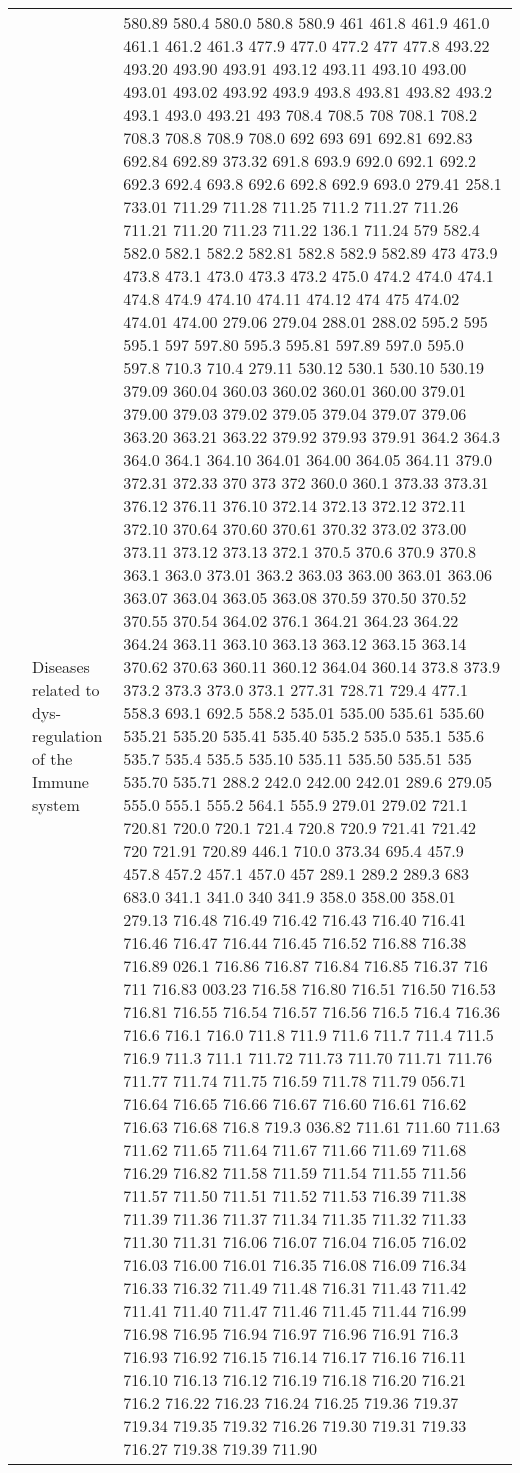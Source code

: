 \begin{longtable}{|R{.05in}|L{.5in}||L{5.75in}|}
   & Diseases related to dys-regulation of the Immune system &   580.89 580.4 580.0 580.8 580.9 461 461.8 461.9 461.0 461.1 461.2 461.3 477.9 477.0 477.2 477 477.8 493.22 493.20 493.90 493.91 493.12 493.11 493.10 493.00 493.01 493.02 493.92 493.9 493.8 493.81 493.82 493.2 493.1 493.0 493.21 493 708.4 708.5 708 708.1 708.2 708.3 708.8 708.9 708.0 692 693 691 692.81 692.83 692.84 692.89 373.32 691.8 693.9 692.0 692.1 692.2 692.3 692.4 693.8 692.6 692.8 692.9 693.0 279.41 258.1 733.01 711.29 711.28 711.25 711.2 711.27 711.26 711.21 711.20 711.23 711.22 136.1 711.24 579 582.4 582.0 582.1 582.2 582.81 582.8 582.9 582.89 473 473.9 473.8 473.1 473.0 473.3 473.2 475.0 474.2 474.0 474.1 474.8 474.9 474.10 474.11 474.12 474 475 474.02 474.01 474.00 279.06 279.04 288.01 288.02 595.2 595 595.1 597 597.80 595.3 595.81 597.89 597.0 595.0 597.8 710.3 710.4 279.11 530.12 530.1 530.10 530.19 379.09 360.04 360.03 360.02 360.01 360.00 379.01 379.00 379.03 379.02 379.05 379.04 379.07 379.06 363.20 363.21 363.22 379.92 379.93 379.91 364.2 364.3 364.0 364.1 364.10 364.01 364.00 364.05 364.11 379.0 372.31 372.33 370 373 372 360.0 360.1 373.33 373.31 376.12 376.11 376.10 372.14 372.13 372.12 372.11 372.10 370.64 370.60 370.61 370.32 373.02 373.00 373.11 373.12 373.13 372.1 370.5 370.6 370.9 370.8 363.1 363.0 373.01 363.2 363.03 363.00 363.01 363.06 363.07 363.04 363.05 363.08 370.59 370.50 370.52 370.55 370.54 364.02 376.1 364.21 364.23 364.22 364.24 363.11 363.10 363.13 363.12 363.15 363.14 370.62 370.63 360.11 360.12 364.04 360.14 373.8 373.9 373.2 373.3 373.0 373.1 277.31 728.71 729.4 477.1 558.3 693.1 692.5 558.2 535.01 535.00 535.61 535.60 535.21 535.20 535.41 535.40 535.2 535.0 535.1 535.6 535.7 535.4 535.5 535.10 535.11 535.50 535.51 535 535.70 535.71 288.2 242.0 242.00 242.01 289.6 279.05 555.0 555.1 555.2 564.1 555.9 279.01 279.02 721.1 720.81 720.0 720.1 721.4 720.8 720.9 721.41 721.42 720 721.91 720.89 446.1 710.0 373.34 695.4 457.9 457.8 457.2 457.1 457.0 457 289.1 289.2 289.3 683 683.0 341.1 341.0 340 341.9 358.0 358.00 358.01 279.13 716.48 716.49 716.42 716.43 716.40 716.41 716.46 716.47 716.44 716.45 716.52 716.88 716.38 716.89 026.1 716.86 716.87 716.84 716.85 716.37 716 711 716.83 003.23 716.58 716.80 716.51 716.50 716.53 716.81 716.55 716.54 716.57 716.56 716.5 716.4 716.36 716.6 716.1 716.0 711.8 711.9 711.6 711.7 711.4 711.5 716.9 711.3 711.1 711.72 711.73 711.70 711.71 711.76 711.77 711.74 711.75 716.59 711.78 711.79 056.71 716.64 716.65 716.66 716.67 716.60 716.61 716.62 716.63 716.68 716.8 719.3 036.82 711.61 711.60 711.63 711.62 711.65 711.64 711.67 711.66 711.69 711.68 716.29 716.82 711.58 711.59 711.54 711.55 711.56 711.57 711.50 711.51 711.52 711.53 716.39 711.38 711.39 711.36 711.37 711.34 711.35 711.32 711.33 711.30 711.31 716.06 716.07 716.04 716.05 716.02 716.03 716.00 716.01 716.35 716.08 716.09 716.34 716.33 716.32 711.49 711.48 716.31 711.43 711.42 711.41 711.40 711.47 711.46 711.45 711.44 716.99 716.98 716.95 716.94 716.97 716.96 716.91 716.3 716.93 716.92 716.15 716.14 716.17 716.16 716.11 716.10 716.13 716.12 716.19 716.18 716.20 716.21 716.2 716.22 716.23 716.24 716.25 719.36 719.37 719.34 719.35 719.32 716.26 719.30 719.31 719.33 716.27 719.38 719.39 711.90 
\end{longtable}
